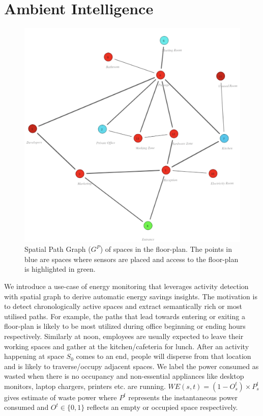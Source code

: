 \documentclass[conference]{IEEEtran}
\begin{document}
\section{Ambient Intelligence}
\label{section:ambient}

\begin{figure}
\centering
  \includegraphics[width=1\linewidth]{./img/energygraph.png}
  \caption{ Spatial Path Graph ($G^P$) of spaces in the floor-plan. The points in blue are spaces where sensors are placed and access to the floor-plan is highlighted in green. }
  \label{fig:energygraph}
\end{figure}


We introduce a use-case of energy monitoring that leverages activity detection with spatial graph to derive automatic energy savings insights. The motivation is to detect chronologically active spaces and extract semantically rich or most utilised paths. For example, the paths that lead towards entering or exiting a floor-plan is likely to be most utilized during office beginning or ending hours respectively. Similarly at noon, employees are usually expected to leave their working spaces and gather at the kitchen/cafeteria for lunch. After an activity happening at space $S_0$ comes to an end, people will disperse from that location and is likely to traverse/occupy adjacent spaces. We label the power consumed as wasted when there is no occupancy and non-essential appliances like desktop monitors, laptop chargers, printers etc. are running. $WE(s, t) =  (1-O_s^t) \times P^t_s$ gives estimate of waste power where $P^t$ represents the instantaneous power consumed and $O^t \in \{0,1\}$ reflects an empty or occupied space respectively.
\end{document}
